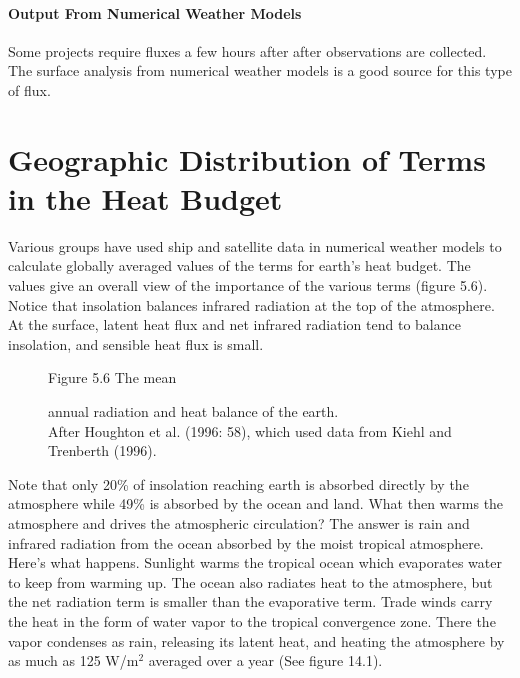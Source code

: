 \paragraph{Output From Numerical Weather Models}
Some projects require fluxes a few hours after after observations are
collected. The surface analysis from numerical weather models is a
good source for this type of flux. 

\section[Geographic Distribution of Terms]{Geographic Distribution of Terms in
the Heat Budget} Various groups have used ship and satellite data in numerical weather models
to calculate globally averaged values of the terms for earth's heat budget. The
values give an overall view of the importance of the various terms (figure 5.6).
Notice that insolation balances infrared radiation at
the top of the atmosphere. At the surface, latent heat flux and net infrared radiation tend to
balance insolation, and sensible heat flux is small.

\begin{figure}[t!]
\centering
\footnotesize
Figure 5.6 The mean \rule{0mm}{4ex}annual radiation and heat
balance of the earth. \\After Houghton et al. (1996: 58), which used data from
Kiehl and Trenberth (1996).
\label{fig:heatbudget}
\vspace{-2ex}
\end{figure}

Note that only 20\% of insolation reaching earth is absorbed
directly by the atmosphere while 49\% is absorbed by the ocean and land. What then warms
the atmosphere and drives the atmospheric circulation? The
answer is rain and infrared radiation from the ocean absorbed by the moist tropical
atmosphere. Here's what happens. Sunlight warms the tropical ocean which evaporates water to keep from warming up. The ocean also radiates heat to the atmosphere, but the net radiation term is smaller than the evaporative term. Trade winds carry the heat in the form of water vapor to the tropical convergence zone. There the vapor condenses as rain, releasing its latent heat, and heating the atmosphere by as much as 125 W/m$^2$ averaged over a year (See figure 14.1).

